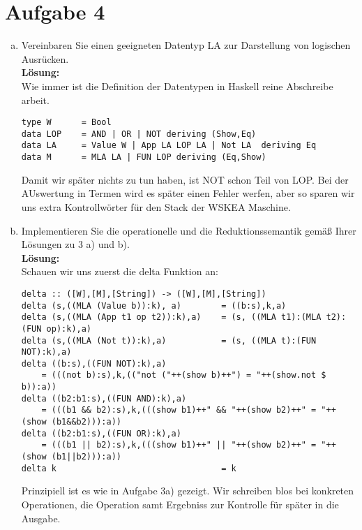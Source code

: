 \documentclass[11pt,a4paper,ngerman]{article}
\begin{document}

\section*{Aufgabe 4}

\begin{enumerate}[a)]
    \item   Vereinbaren Sie einen geeigneten Datentyp LA zur Darstellung 
            von logischen Ausrücken.\\
            \textbf{Lösung:}\\
            
            Wie immer ist die Definition der Datentypen in Haskell reine Abschreibe arbeit.
            \begin{lstlisting}
type W      = Bool
data LOP    = AND | OR | NOT deriving (Show,Eq)
data LA     = Value W | App LA LOP LA | Not LA  deriving Eq
data M      = MLA LA | FUN LOP deriving (Eq,Show)
            \end{lstlisting}
            Damit wir später nichts zu tun haben, ist NOT schon Teil von LOP. Bei der
            AUswertung in Termen wird es später einen Fehler werfen, aber so
            sparen wir uns extra Kontrollwörter für den Stack der WSKEA Maschine.


    \item   Implementieren Sie die operationelle und die Reduktionssemantik
            gemäß Ihrer Lösungen zu 3 a) und b).\\
            \textbf{Lösung:}\\
           
            Schauen wir uns zuerst die delta Funktion an:
            \begin{lstlisting}
delta :: ([W],[M],[String]) -> ([W],[M],[String])
delta (s,((MLA (Value b)):k), a)        = ((b:s),k,a)
delta (s,((MLA (App t1 op t2)):k),a)    = (s, ((MLA t1):(MLA t2):(FUN op):k),a)
delta (s,((MLA (Not t)):k),a)           = (s, ((MLA t):(FUN NOT):k),a)
delta ((b:s),((FUN NOT):k),a)       
    = (((not b):s),k,(("not ("++(show b)++") = "++(show.not $ b)):a))
delta ((b2:b1:s),((FUN AND):k),a)   
    = (((b1 && b2):s),k,(((show b1)++" && "++(show b2)++" = "++(show (b1&&b2))):a))
delta ((b2:b1:s),((FUN OR):k),a)   
    = (((b1 || b2):s),k,(((show b1)++" || "++(show b2)++" = "++(show (b1||b2))):a))
delta k                                 = k
            \end{lstlisting} 
            Prinzipiell ist es wie in Aufgabe 3a) gezeigt. Wir schreiben blos bei
            konkreten Operationen, die Operation samt Ergebniss zur Kontrolle
            für später in die Ausgabe.\\


\end{enumerate}
\end{document}
